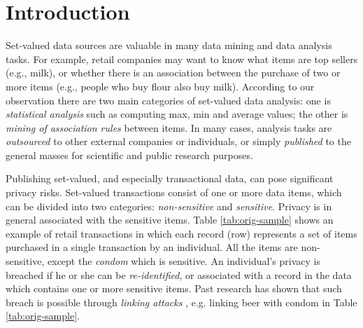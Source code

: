 \section{Introduction}
\label{sec:intro}

Set-valued data sources are valuable in many data mining and
data analysis tasks. For example, retail companies may want to know what
items are top sellers (e.g., milk), or whether there is an association
between the purchase of two or more items (e.g., people who buy flour also
buy milk). 
According to our observation there are two main categories of set-valued
data analysis: one is {\em statistical analysis} such as
computing max, min and average values; 
the other is {\em mining of association rules} between items. 
In many cases, analysis tasks 
are {\em outsourced} to other external companies or
individuals, or simply {\em published} to the general
masses for scientific and public research purposes.

Publishing set-valued, and especially transactional data,
can pose significant privacy risks.
Set-valued transactions consist of one or more data items, which can be divided into two categories: {\em non-sensitive} and {\em sensitive}.
Privacy is in general associated with the sensitive items.
Table \ref{tab:orig-sample} shows
an example of retail transactions in which each record (row) represents
a set of items purchased in a single transaction by an individual.
All the items are non-sensitive, except the {\em condom}
which is sensitive. An individual's privacy is breached if he or she can be
{\em re-identified}, or associated with a record in the data which contains
one or more sensitive items. 
Past research has shown that such breach is
possible through {\em linking attacks} \cite{FungWCY10:Survey}, e.g.
linking beer with condom in Table \ref{tab:orig-sample}. 

